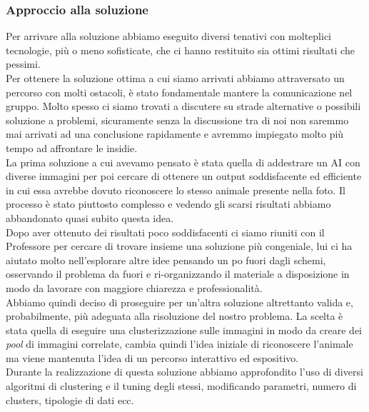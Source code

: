 \documentclass[12pt,a4paper,twoside]{article}
\begin{document}
\subsubsection{Approccio alla soluzione}
Per arrivare alla soluzione abbiamo eseguito diversi tenativi con molteplici tecnologie, più o meno 
sofisticate, che ci hanno restituito sia ottimi risultati che pessimi.\\
Per ottenere la soluzione ottima a cui siamo arrivati abbiamo attraversato un percorso con molti ostacoli, 
è stato fondamentale mantere la comunicazione nel gruppo. Molto spesso ci siamo trovati a discutere su 
strade alternative o possibili soluzione a problemi, sicuramente senza la discussione tra di noi non 
saremmo mai arrivati ad una conclusione rapidamente e avremmo impiegato molto più tempo ad affrontare le 
insidie.\\
La prima soluzione a cui avevamo pensato è stata quella di addestrare un AI con diverse immagini per poi 
cercare di ottenere un output soddisfacente ed efficiente in cui essa avrebbe dovuto riconoscere lo stesso 
animale presente nella foto. Il processo è stato piuttosto complesso e vedendo gli scarsi risultati abbiamo 
abbandonato quasi subito questa idea.\\
Dopo aver ottenuto dei risultati poco soddisfacenti ci siamo riuniti con il Professore per cercare di 
trovare insieme una soluzione più congeniale, lui ci ha aiutato molto nell'esplorare altre idee pensando un 
po fuori dagli schemi, osservando il problema da fuori e ri-organizzando il materiale a disposizione in 
modo da lavorare con maggiore chiarezza e professionalità.\\
Abbiamo quindi deciso di proseguire per un'altra soluzione altrettanto valida e, probabilmente, più adeguata 
alla risoluzione del nostro problema. La scelta è stata quella di eseguire una clusterizzazione sulle 
immagini in modo da creare dei \textit{pool} di immagini correlate, cambia quindi l'idea iniziale di 
riconoscere l'animale ma viene mantenuta l'idea di un percorso interattivo ed espositivo.\\
Durante la realizzazione di questa soluzione abbiamo approfondito l'uso di diversi algoritmi di clustering 
e il tuning degli stessi, modificando parametri, numero di clusters, tipologie di dati ecc.
\end{document}
